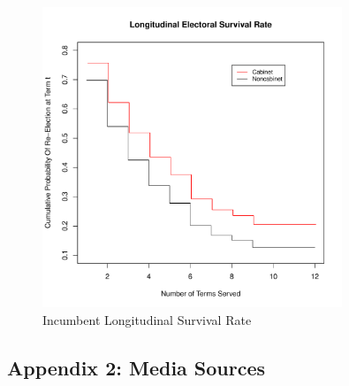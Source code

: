 \documentclass[letter,12pt]{article}
\begin{document}
\begin{figure}[!htb]
\centering
\caption{Incumbent Longitudinal Survival Rate}
	\includegraphics[width = 0.8\textwidth]{includes/cumulative_survival}
\end{figure}
\clearpage
\pagebreak

\subsection*{Appendix 2: Media Sources}


\newpage
\end{document}
